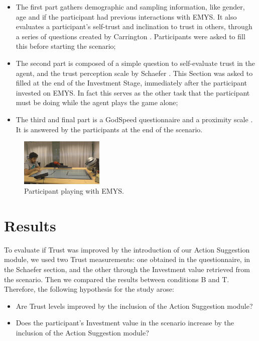 \begin{itemize}
    \item The first part gathers demographic and sampling information, like gender, age and if the participant had previous interactions with \ac{EMYS}. It also evaluates a participant's self-trust and inclination to trust in others, through a series of questions created by Carrington \cite{Carrington2007}. Participants were asked to fill this before starting the scenario;
    \item The second part is composed of a simple question to self-evaluate trust in the agent, and the trust perception scale by Schaefer \cite{Schaefer2013}. This Section was asked to filled at the end of the Investment Stage, immediately after the participant invested on \ac{EMYS}. In fact this serves as the other task that the participant must be doing while the agent plays the game alone;
    \item The third and final part is a GodSpeed questionnaire \cite{Bartneck2009,Lehmann2015} and a proximity scale \cite{Aron1992}. It is answered by the participants at the end of the scenario.
\end{itemize}

\begin{figure}[]
    \centering
    \includegraphics[width=150px]{figures/ScenarioScreenShot.png}
    \caption{Participant playing with EMYS.}
    \label{fig:ScenarioScreenShot}
\end{figure}

\section{Results}
To evaluate if Trust was improved by the introduction of our Action Suggestion module, we used two Trust measurements: one obtained in the questionnaire, in the Schaefer section, and the other through the Investment value retrieved from the scenario. Then we compared the results between conditions B and T. Therefore, the following hypothesis for the study arose:

\begin{itemize}
    \item Are Trust levels improved by the inclusion of the Action Suggestion module?
    \item Does the participant's Investment value in the scenario increase by the inclusion of the Action Suggestion module?
\end{itemize}

